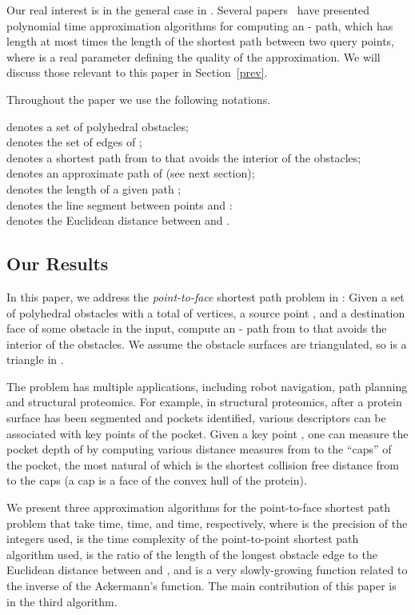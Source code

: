 \documentclass{llncs}
\begin{document}
Our real interest is in the general case in .
Several papers~\cite{Pap85,Clar87,Sar99} have presented polynomial time
approximation algorithms for computing an - path, which has length at
most  times the length of the shortest path between two query points,
where  is a real parameter defining the quality of the approximation.
We will discuss those relevant to this paper in Section~\ref{prev}.

Throughout the paper we use the following notations.

\begin{tabbing}
 denotes a set of polyhedral obstacles;\\
 denotes the set of edges of ;\\
 denotes a shortest path from  to  that avoids the interior of the obstacles; \\
 denotes an approximate path of  (see next section); \\
 denotes the length of a given path ; \\
 denotes the line segment between points  and :\\
 denotes the Euclidean distance between  and .\\
\end{tabbing}

\subsection{Our Results}

In this paper, we address the {\em point-to-face} shortest path problem in :
Given a set of polyhedral obstacles with a total of  vertices, a source point , and a destination
face  of some obstacle in the input, compute an - path from  to  that
avoids the interior of the obstacles.
We assume the obstacle surfaces are triangulated, so  is a triangle in .


The problem has multiple applications, including robot navigation, path planning and
structural proteomics.
For example, in structural proteomics, after a protein surface has been segmented and pockets identified,
various descriptors can be associated
with key points of the pocket. Given a key point , one can measure the pocket depth of  by
computing various distance measures from
 to the ``caps'' of the pocket, the most natural of which is the shortest collision free
distance from  to the caps (a cap is a face of the convex hull of the protein).

We present three approximation algorithms for the point-to-face shortest path problem that take
 time,
 time, and
 time,
respectively, where  is the precision of the integers used,  is the time
complexity of the point-to-point shortest path algorithm used,  is the ratio of the length
of the longest obstacle edge to the
Euclidean distance between  and , and  is a very slowly-growing function related to
the inverse of the Ackermann's function. The main contribution of this paper is in the third algorithm.
\end{document}
